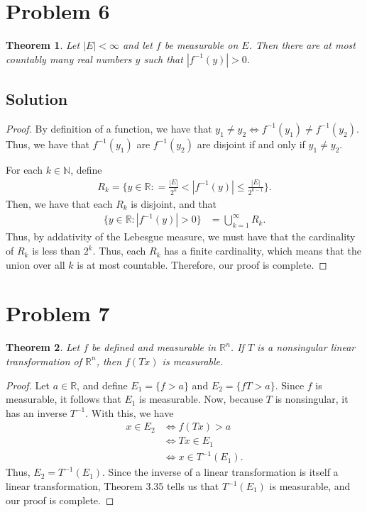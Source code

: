 \documentclass[10pt,a4paper]{article}
\theoremstyle{theorem}
\newtheorem{theorem}{Theorem}
\theoremstyle{definition}
\begin{document}
\section*{Problem 6}
\begin{theorem}
Let $|E| < \infty$ and let $f$ be measurable on $E$. Then there are at most countably many real numbers $y$ such that $|f^{-1}(y)| > 0$.
\end{theorem}

\subsection*{Solution}
\begin{proof}
By definition of a function, we have that $y_1 \not = y_2 \iff f^{-1}(y_1) \not = f^{-1}(y_2)$. Thus, we have that $f^{-1}(y_1) $ are $f^{-1}(y_2)$ are disjoint if and only if $y_1 \not = y_2$.

For each $k \in \mathbb{N}$, define 
\begin{align*}
R_k = \biggl\{ y \in \mathbb{R}: = \frac{|E|}{2^{k}}< |f^{-1}(y)| \leq \frac{|E|}{2^{k - 1}} \biggr\}.
\end{align*}
Then, we have that each $R_k$ is disjoint, and that 
\begin{align*}
\{y \in \mathbb{R}: |f^{-1}(y)| > 0 \} &= \bigcup_{k=1}^\infty R_k.
\end{align*}
Thus, by addativity of the Lebesgue measure, we must have that the cardinality of $R_k$ is less than $2^k$. Thus, each $R_k$ has a finite cardinality,  which means that the union over all $k$ is at most countable. Therefore, our proof is complete.
\end{proof}

\section*{Problem 7}
\begin{theorem}
Let $f$ be defined and measurable in $\mathbb{R}^n$. If $T$ is a nonsingular linear transformation of $\mathbb{R}^n$, then $f(Tx)$ is measurable.
\end{theorem}

\begin{proof}
Let $a \in \mathbb{R}$, and define $E_1 = \{f > a \}$ and $E_2 = \{fT > a \}$. Since $f$ is measurable, it follows that $E_1$ is measurable. Now, because $T$ is nonsingular, it has an inverse $T^{-1}$. With this, we have
\begin{align*}
x \in E_2 &\iff f(Tx) > a\\
&\iff Tx \in E_1\\
&\iff x \in T^{-1} (E_1).
\end{align*}
Thus, $E_2 = T^{-1}(E_1)$. Since the inverse of a linear transformation is itself a linear transformation, Theorem 3.35 tells us that $T^{-1} (E_1)$ is measurable, and our proof is complete.
\end{proof}
\end{document}
